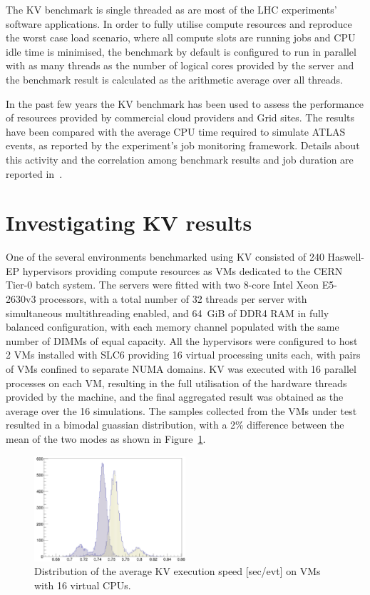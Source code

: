 The KV benchmark is single threaded as are most of the LHC experiments'
software applications. In order to fully utilise compute resources and reproduce
the worst case load scenario, where all compute slots are running jobs and
CPU idle time is minimised, the benchmark by default is configured to run in parallel 
with as many threads as the number of logical cores 
provided by the server and the benchmark result is calculated as the arithmetic 
average over all threads.

In the past few years the KV benchmark has been used to assess the performance of
resources provided by commercial cloud providers and Grid sites. The results 
have been compared with the average CPU time required to simulate ATLAS events, 
as reported by the experiment's job monitoring framework. Details about this activity 
and the correlation among benchmark results and job duration are reported 
in~\cite{bmk}.


\section{Investigating KV results}
One of the several environments benchmarked using KV consisted of
 240 Haswell-EP hypervisors providing compute
resources as VMs dedicated to the CERN Tier-0 batch system. The servers were
fitted with two 8-core Intel Xeon E5-2630v3 processors, with a total number  
of 32 threads per server with simultaneous multithreading enabled, and 64~GiB    
of DDR4 RAM in fully balanced configuration, with each memory channel populated with
the same number of DIMMs of equal capacity. All the hypervisors were configured 
to host 2 VMs installed with SLC6 providing 16 virtual processing units each, with pairs of VMs 
confined to separate NUMA domains. KV was executed with 16 parallel processes 
on each VM, resulting in the full utilisation of the hardware threads provided
by the machine, and the final aggregated result was obtained as the average over 
the 16 simulations. The samples collected from the VMs under test resulted in a bimodal guassian 
distribution, with a 2\% difference between the 
mean of the two modes as shown in Figure~\ref{dual-mode-gaussian}.


\begin{figure}[ht]
\begin{center}
\includegraphics[width=0.5\textwidth]{images/dual-mode-gaussian.png}
\end{center}
\caption{\label{dual-mode-gaussian} Distribution of the average KV execution speed [sec/evt] on  VMs with 16 virtual CPUs. }
\end{figure}



